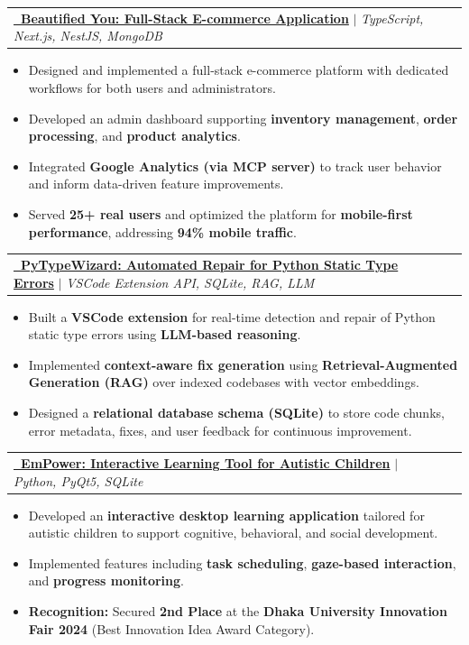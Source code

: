 \documentclass[letterpaper,11pt]{article}
\makeatletter
\newcommand{\customItem}[1]{
  \item\small{
    {#1 \vspace{-2pt}}
  }
}
\newcommand{\customProject}[2]{
    \item
    \begin{tabular*}{1.001\textwidth}{l@{\extracolsep{\fill}}r}
      \small#1 & \textbf{\small #2}\\
    \end{tabular*}\vspace{-7pt}
}
\newcommand{\customItemListStart}{\begin{itemize}}
\newcommand{\customItemListEnd}{\end{itemize}\vspace{-5pt}}
\makeatother
\begin{document}
    \customProject
        {\textbf{\href{https://beautifiedyoubd.com/}
        {\faLink\ Beautified You: Full-Stack E-commerce Application}} $|$ 
        \emph{TypeScript, Next.js, NestJS, MongoDB}}
        {}
        \customItemListStart
            \customItem{Designed and implemented a full-stack e-commerce platform with dedicated workflows for both users and administrators.}
            \customItem{Developed an admin dashboard supporting \textbf{inventory management}, \textbf{order processing}, and \textbf{product analytics}.}
            \customItem{Integrated \textbf{Google Analytics (via MCP server)} to track user behavior and inform data-driven feature improvements.}
            \customItem{Served \textbf{25+ real users} and optimized the platform for \textbf{mobile-first performance}, addressing \textbf{94\% mobile traffic}.}
        \customItemListEnd
        \vspace{-13pt}

      \customProject
          {\textbf{\href{https://github.com/ahmedfahad04/PyTypeWizard}{\faLink\ PyTypeWizard: Automated Repair for Python Static Type Errors}} $|$ 
          \emph{VSCode Extension API, SQLite, RAG, LLM}}
          {}
          \customItemListStart
            \customItem{Built a \textbf{VSCode extension} for real-time detection and repair of Python static type errors using \textbf{LLM-based reasoning}.}
            \customItem{Implemented \textbf{context-aware fix generation} using \textbf{Retrieval-Augmented Generation (RAG)} over indexed codebases with vector embeddings.}
            \customItem{Designed a \textbf{relational database schema (SQLite)} to store code chunks, error metadata, fixes, and user feedback for continuous improvement.}
          \customItemListEnd
          \vspace{-13pt}

    
      \customProject
          {\textbf{\href{https://github.com/ahmedfahad04/EmPower}{\faLink\ EmPower: Interactive Learning Tool for Autistic Children}} $|$ 
          \emph{Python, PyQt5, SQLite}}
          {}
          \customItemListStart
            \customItem{Developed an \textbf{interactive desktop learning application} tailored for autistic children to support cognitive, behavioral, and social development.}
            \customItem{Implemented features including \textbf{task scheduling}, \textbf{gaze-based interaction}, and \textbf{progress monitoring}.}
            \customItem{\textbf{Recognition:} Secured \textbf{2nd Place} at the \textbf{Dhaka University Innovation Fair 2024} (Best Innovation Idea Award Category).}
          \customItemListEnd
          \vspace{-13pt}
\end{document}
